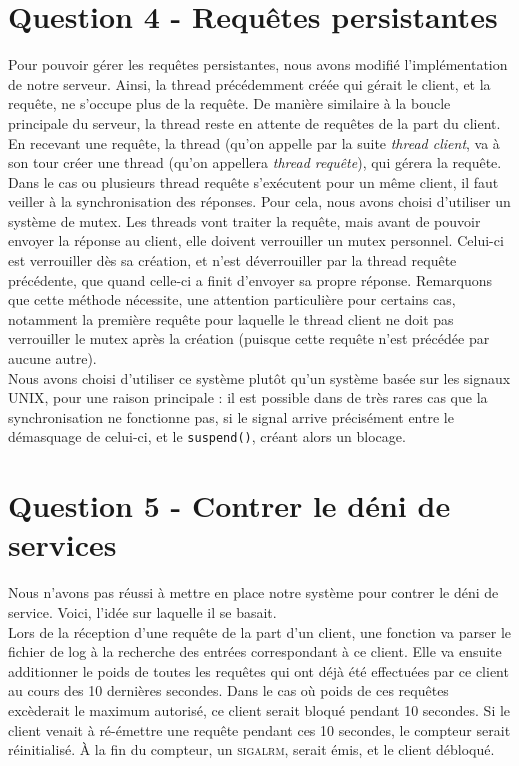 \documentclass[final,12pt]{article}
\begin{document}
        
\section*{\textbf{Question 4} - Requêtes persistantes {\color{green}\checkmark}}
	Pour pouvoir gérer les requêtes persistantes, nous avons modifié l'implémentation de notre serveur.
	Ainsi, la thread précédemment créée qui gérait le client, et la requête, ne s'occupe plus de la requête. De manière similaire à la boucle principale du serveur, la thread reste en attente de requêtes de la part du client. En recevant une requête, la thread (qu'on appelle par la suite \textit{thread client}, va à son tour créer une thread (qu'on appellera \textit{thread requête}), qui gérera la requête.
	Dans le cas ou plusieurs thread requête s'exécutent pour un même client, il faut veiller à la synchronisation des réponses. Pour cela, nous avons choisi d'utiliser un système de mutex.
	Les threads vont traiter la requête, mais avant de pouvoir envoyer la réponse au client, elle doivent verrouiller un mutex personnel. Celui-ci est verrouiller dès sa création, et n'est déverrouiller par la thread requête précédente, que quand celle-ci a finit d'envoyer sa propre réponse. Remarquons que cette méthode nécessite, une attention particulière pour certains cas, notamment la première requête pour laquelle le thread client ne doit pas verrouiller le mutex après la création (puisque cette requête n'est précédée par aucune autre).\\
	Nous avons choisi d'utiliser ce système plutôt qu'un système basée sur les signaux UNIX, pour une raison principale : il est possible dans de très rares cas que la synchronisation ne fonctionne pas, si le signal arrive précisément entre le démasquage de celui-ci, et le \texttt{suspend()}, créant alors un blocage.

\section*{\textbf{Question 5} - Contrer le déni de services {\color{red}}}
	Nous n'avons pas réussi à mettre en place notre système pour contrer le déni de service.
	Voici, l'idée sur laquelle il se basait.\\
	Lors de la réception d'une requête de la part d'un client, une fonction va parser le fichier de log à la recherche des entrées correspondant à ce client. Elle va ensuite additionner le poids de toutes les requêtes qui ont déjà été effectuées par ce client au cours des 10 dernières secondes. Dans le cas où poids de ces requêtes excèderait le maximum autorisé, ce client serait bloqué pendant 10 secondes. Si le client venait à ré-émettre une requête pendant ces 10 secondes, le compteur serait réinitialisé. \`A la fin du compteur, un \textsc{sigalrm}, serait émis, et le client débloqué.
\end{document}
